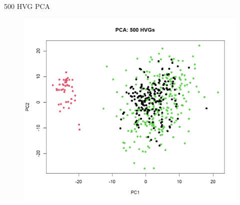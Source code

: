 \documentclass[12pt, aspectratio=43]{beamer}
\begin{document}
	\begin{frame}{500 HVG PCA}
		\begin{figure}[h!]
			\centering
			\includegraphics[width=0.8\linewidth]{hvgs.png}
		\end{figure}
	\end{frame}
	
\end{document}

